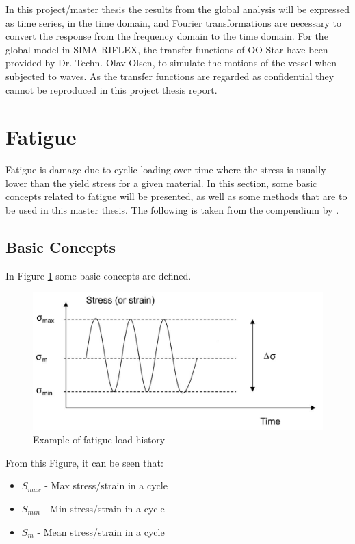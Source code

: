 \noindent In this project/master thesis the results from the global analysis will be expressed as time series, in the time domain, and Fourier transformations are necessary to convert the response from the frequency domain to the time domain. \newline
\newline 
\noindent For the global model in SIMA RIFLEX, the transfer functions of OO-Star have been provided by Dr. Techn. Olav Olsen, to simulate the motions of the vessel when subjected to waves. As the transfer functions are regarded as confidential they cannot be reproduced in this project thesis report.   

\section{Fatigue}
Fatigue is damage due to cyclic loading over time where the stress is usually lower than the yield stress for a given material. In this section, some basic concepts related to fatigue will be presented, as well as some methods that are to be used in this master thesis. The following is taken from the compendium by \cite{fatigue2016}. \newline
\newline
\subsection{Basic Concepts}
In Figure \ref{fig:fatigue} some basic concepts are defined. 

\begin{figure}[h!]
\centering
\includegraphics[scale=0.6]{figures/cycle}
\caption[$\; \:$Example of fatigue load history]{Example of fatigue load history  \cite{fatigue2016} }
 \label{fig:fatigue}
\end{figure}

From this Figure, it can be seen that:
\begin{itemize}
    \item $S_{max}$ -  Max stress/strain in a cycle
    \item $S_{min}$ -  Min stress/strain in a cycle
    \item $S_{m}$ - Mean stress/strain in a cycle
\end{itemize}

